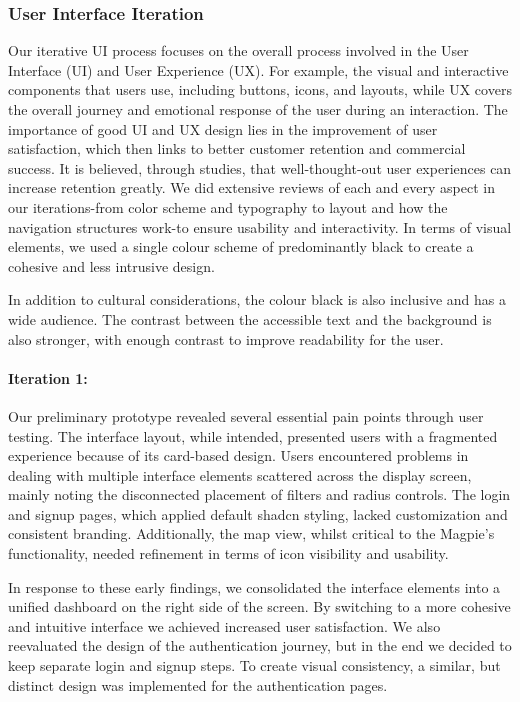 \subsubsection{User Interface Iteration}
Our iterative UI process focuses on the overall process involved in the User
Interface (UI) and User Experience (UX). For example, the visual and interactive
components that users use, including buttons, icons, and layouts, while UX
covers the overall journey and emotional response of the user during an
interaction. The importance of good UI and UX design lies in the improvement of
user satisfaction, which then links to better customer retention and commercial
success. It is believed, through studies, that well-thought-out user experiences
can increase retention greatly.\cite{psycray2023} We did extensive reviews of
each and every aspect in our iterations-from color scheme and typography to
layout and how the navigation structures work-to ensure usability and
interactivity. In terms of visual elements, we used a single colour scheme of
predominantly black to create a cohesive and less intrusive design.

In addition to cultural considerations, the colour black is also inclusive and
has a wide audience. The contrast between the accessible text and the background
is also stronger, with enough contrast to improve readability for the user.

\paragraph{Iteration 1:}

Our preliminary prototype revealed several essential pain points through
user testing. The interface layout, while intended, presented users
with a fragmented experience because of its card-based design.
Users encountered problems in dealing with multiple interface elements scattered
across the display screen, mainly noting the disconnected placement of filters
and radius controls. The login and signup pages, which applied default shadcn
styling, lacked customization and consistent branding. Additionally, the map
view, whilst critical to the Magpie's functionality, needed refinement in
terms of icon visibility and usability.

In response to these early findings, we consolidated the interface elements into
a unified dashboard on the right side of the screen. By switching to a more cohesive 
and intuitive interface we achieved increased user satisfaction. We also reevaluated
the design of the authentication journey, but in the end we decided to keep separate 
login and signup steps. To create visual consistency, a similar, but distinct design 
was implemented for the authentication pages.

